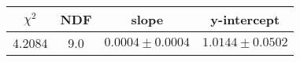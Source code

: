 \begin{tabular}{|c|c|c|c|}

\hline
$\chi^{2}$ & NDF & slope & y-intercept  \\
\hline
4.2084 & 9.0 & $0.0004\pm0.0004$ & $1.0144\pm0.0502$ \\
\hline

\end{tabular}